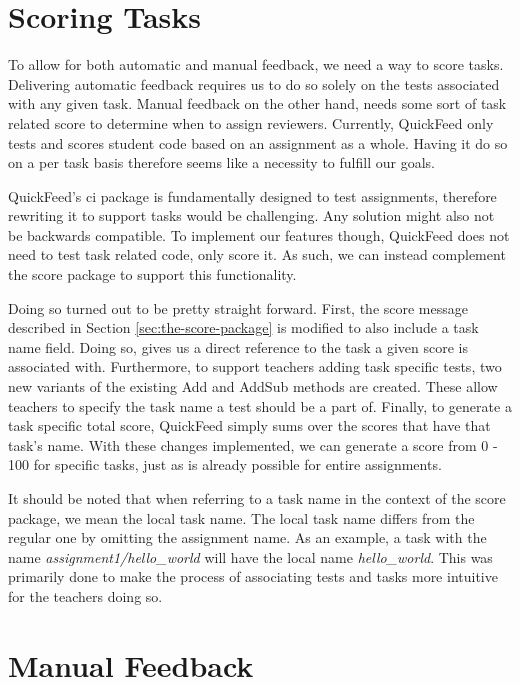 \section{Scoring Tasks}

To allow for both automatic and manual feedback, we need a way to score tasks.
Delivering automatic feedback requires us to do so solely on the tests associated with any given task.
Manual feedback on the other hand, needs some sort of task related score to determine when to assign reviewers.
Currently, QuickFeed only tests and scores student code based on an assignment as a whole.
Having it do so on a per task basis therefore seems like a necessity to fulfill our goals.

QuickFeed's ci package is fundamentally designed to test assignments, therefore rewriting it to support tasks would be challenging.
Any solution might also not be backwards compatible.
To implement our features though, QuickFeed does not need to test task related code, only score it.
As such, we can instead complement the score package to support this functionality.

Doing so turned out to be pretty straight forward.
First, the score message described in Section \ref{sec:the-score-package} is modified to also include a task name field.
Doing so, gives us a direct reference to the task a given score is associated with.
Furthermore, to support teachers adding task specific tests, two new variants of the existing Add and AddSub methods are created.
These allow teachers to specify the task name a test should be a part of.
Finally, to generate a task specific total score, QuickFeed simply sums over the scores that have that task's name.
With these changes implemented, we can generate a score from 0 - 100 for specific tasks, just as is already possible for entire assignments.

It should be noted that when referring to a task name in the context of the score package, we mean the local task name.
The local task name differs from the regular one by omitting the assignment name.
As an example, a task with the name \textit{assignment1/hello\_world} will have the local name \textit{hello\_world}.
This was primarily done to make the process of associating tests and tasks more intuitive for the teachers doing so.


\section{Manual Feedback}

